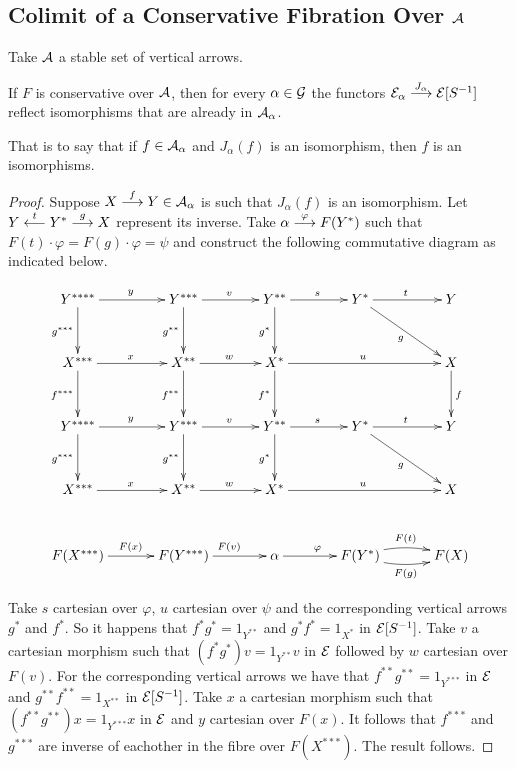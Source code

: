 \subsection{Colimit of a Conservative Fibration Over $\mathcal{A}$}
Take  $\mathcal{A}$   a stable set of vertical arrows.


\begin{theorem} \label{colimit of conservative fibration}
If  $F$ is conservative over $\mathcal{A}$, then for every $\alpha \in \mathcal{G}$ the functors 
\mbox{$\mathcal{E}_\alpha \overset {J_\alpha} {\longrightarrow} \mathcal{E}[S^{-1}]$} reflect isomorphisms that are already in $\mathcal{A}_\alpha$.
\end{theorem}

\noindent That is to say that if $f \in \mathcal{A}_\alpha$ and $J_\alpha(f)$ is an isomorphism, then $f$ is an isomorphisms.

\begin{proof}
Suppose ${X \overset {f} {\longrightarrow} Y \in \mathcal{A}_\alpha}$ is such that $J_\alpha(f)$ is an isomorphism. Let ${Y \overset {t} {\longleftarrow} Y^* \overset {g} {\longrightarrow} X}$ represent its inverse. Take ${\alpha \overset {\varphi} {\longrightarrow} F(Y^*)}$ such that ${F(t) \cdot \varphi=F(g) \cdot \varphi}=\psi$ and construct the following commutative diagram as indicated below.

\begin{align*}
\xymatrix @+2ex {Y^{****} \ar[r]^y \ar[d]_{g^{***}} & Y^{***} \ar[r]^v \ar[d]_{g^{**}}& Y^{**} \ar[r]^s \ar[d]_{g^{*}}& Y^* \ar[r]^t \ar[dr]_g & Y \\
		  X^{***} \ar[r]^x \ar[d]_{f^{***}}& X^{**} \ar[r]^w \ar[d]_{f^{**}}& X^* \ar[rr]^u \ar[d]_{f^{*}} && X \ar[d]^f \\
		  Y^{****} \ar[r]^y \ar[d]_{g^{***}} & Y^{***} \ar[r]^v \ar[d]_{g^{**}}& Y^{**} \ar[r]^s \ar[d]_{g^{*}}& Y^* \ar[r]^t \ar[dr]_g & Y \\
      	  X^{***} \ar[r]^x & X^{**} \ar[r]^w & X^* \ar[rr]^u && X \\		 
      	  F(X^{***}) \ar[r]^{F(x)} & F(Y^{***}) \ar[r]^{F(v)} & \alpha \ar[r]^\varphi & F(Y^*) \ar@/^/[r]^{F(t)} \ar@/_/[r]_{F(g)} & F(X)    }
\end{align*}

\noindent Take $s$ cartesian over $\varphi$, $u$ cartesian over $\psi$ and the corresponding vertical arrows $g^*$ and $f^*$. So it happens that $f^*g^*=1_{Y^{**}}$ and $g^*f^*=1_{X^*}$ in $\mathcal{E}[S^{-1}]$. Take $v$ a cartesian morphism such that $(f^*g^*)v=1_{Y^{**}}v$ in $\mathcal{E}$ followed by $w$ cartesian over $F(v)$. For the corresponding vertical arrows we have that $f^{**}g^{**}=1_{Y^{***}}$ in $\mathcal{E}$ and $g^{**}f^{**}=1_{X^{**}}$ in $\mathcal{E}[S^{-1}]$. Take $x$ a cartesian morphism such that $(f^{**}g^{**})x=1_{Y^{***}}x$ in $\mathcal{E}$ and $y$ cartesian over $F(x)$. It follows that $f^{***}$ and $g^{***}$ are inverse of eachother in the fibre over $F(X^{***})$. The result follows.



\end{proof}